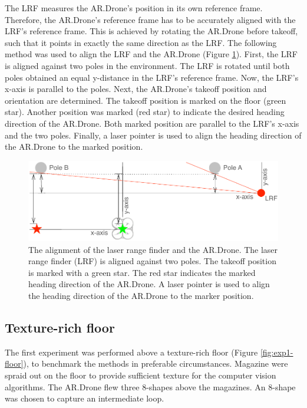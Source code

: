The LRF measures the AR.Drone's position in its own reference frame.
Therefore, the AR.Drone's reference frame has to be accurately aligned with the LRF's reference frame.
This is achieved by rotating the AR.Drone before takeoff, such that it points in exactly the same direction as the LRF.
The following method was used to align the LRF and the AR.Drone (Figure \ref{fig:exp1-floorplan-align}).
First, the LRF is aligned against two poles in the environment.
The LRF is rotated until both poles obtained an equal y-distance in the LRF's reference frame.
Now, the LRF's x-axis is parallel to the poles.
Next, the AR.Drone's takeoff position and orientation are determined.
The takeoff position is marked on the floor (green star).
Another position was marked (red star) to indicate the desired heading direction of the AR.Drone.
Both marked position are parallel to the LRF's x-axis and the two poles.
Finally, a laser pointer is used to align the heading direction of the AR.Drone to the marked position.

\begin{figure}[htb]
\centering
\includegraphics[width=13cm]{images/exp1-floorplan-align.pdf}
\caption{The alignment of the laser range finder and the AR.Drone. The laser range finder (LRF) is aligned against two poles. The takeoff position is marked with a green star. The red star indicates the marked heading direction of the AR.Drone. A laser pointer is used to align the heading direction of the AR.Drone to the marker position.}
\label{fig:exp1-floorplan-align}
\end{figure}








\subsection{Texture-rich floor}
\label{sec:exp1-texture-rich}
The first experiment was performed above a texture-rich floor (Figure \ref{fig:exp1-floor}), to benchmark the methods in preferable circumstances.
Magazine were spraid out on the floor to provide sufficient texture for the computer vision algorithms.
The AR.Drone flew three 8-shapes above the magazines.
An 8-shape was chosen to capture an intermediate loop.


